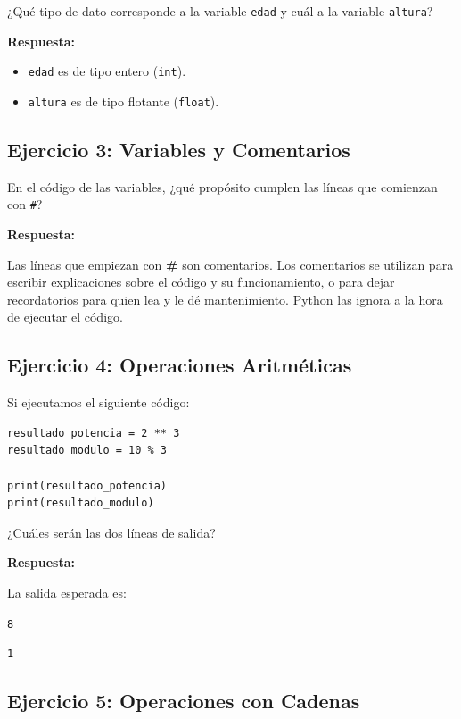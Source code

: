 \documentclass[12pt]{article}
\newcommand{\respuesta}{
    \vspace{0.3cm}
    \noindent\textbf{Respuesta:}
    \vspace{0.2cm}
}
\begin{document}
¿Qué tipo de dato corresponde a la variable \texttt{edad} y cuál a la variable \texttt{altura}?

\respuesta

\begin{itemize}
    \item \texttt{edad} es de tipo entero (\texttt{int}).
    \item \texttt{altura} es de tipo flotante (\texttt{float}).
\end{itemize}


\subsection*{Ejercicio 3: Variables y Comentarios}

En el código de las variables, ¿qué propósito cumplen las líneas que comienzan con \texttt{\#}?

\respuesta

Las líneas que empiezan con \textbf{\#} son comentarios. Los comentarios se utilizan para escribir explicaciones sobre el código y su funcionamiento, o para dejar recordatorios para quien lea y le dé mantenimiento. Python las ignora a la hora de ejecutar el código.


\subsection*{Ejercicio 4: Operaciones Aritméticas}

Si ejecutamos el siguiente código:

\begin{lstlisting}
resultado_potencia = 2 ** 3
resultado_modulo = 10 % 3

print(resultado_potencia)
print(resultado_modulo)
\end{lstlisting}

¿Cuáles serán las dos líneas de salida?

\respuesta

La salida esperada es:

\begin{center}
\texttt{8}

\texttt{1}
\end{center}


\subsection*{Ejercicio 5: Operaciones con Cadenas}
\end{document}
